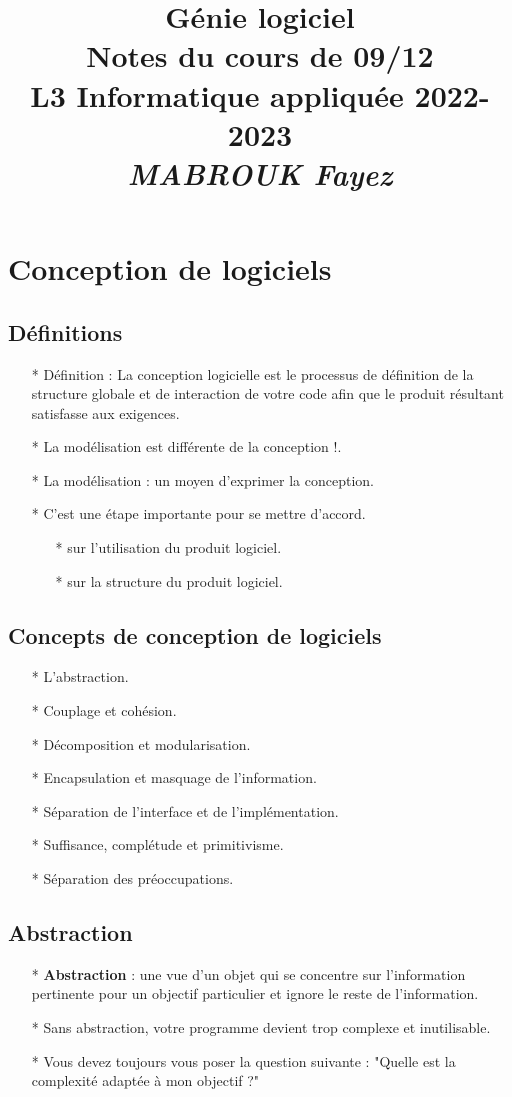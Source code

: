 \documentclass[12pt]{article}
\title{{\bf  Génie logiciel} \\
	Notes du cours de 09/12  \\
	{\small L3 Informatique appliquée 2022-2023} \\
	{\it \small MABROUK Fayez}}
\begin{document}
	\maketitle
	\newpage
	\section{Conception de logiciels}
	\subsection{Définitions}
	\begin{itemize}
		\item[* ] Définition : La conception logicielle est le processus de définition de la structure globale et de 
		interaction de votre code afin que le produit résultant satisfasse aux exigences.
		\item[* ] La modélisation est différente de la conception !.
		\item[* ] La modélisation : un moyen d'exprimer la conception.
		\item[* ] C'est une étape importante pour se mettre d'accord.
		\begin{itemize}
			\item[* ] sur l'utilisation du produit logiciel.
			\item[* ] sur la structure du produit logiciel.
		\end{itemize}
	\end{itemize}
\subsection{Concepts de conception de logiciels}
\begin{itemize}
	\item[* ] L'abstraction.
	\item[* ] Couplage et cohésion.
	\item[* ] Décomposition et modularisation.
	\item[* ] Encapsulation et masquage de l'information.
	\item[* ] Séparation de l'interface et de l'implémentation.
	\item[* ] Suffisance, complétude et primitivisme.
	\item[* ] Séparation des préoccupations.
\end{itemize}
\subsection{Abstraction}
\begin{itemize}
	\item[* ] \textbf{Abstraction} : une vue d'un objet qui se concentre sur l'information pertinente pour un objectif particulier et ignore le reste de l'information.
	\item[* ] Sans abstraction, votre programme devient trop complexe et inutilisable.
	\item[* ] Vous devez toujours vous poser la question suivante : "Quelle est la complexité adaptée à mon objectif ?"
	
\end{itemize}
\end{document}

